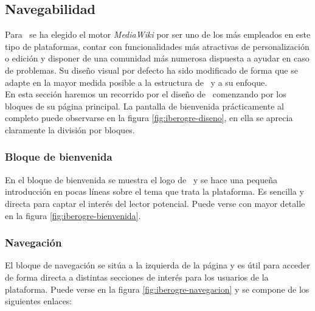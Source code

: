 
\subsection{Navegabilidad}

Para \wiki\ se ha elegido el motor \textit{MediaWiki} \cite{website:wikimedia} por
ser uno de los más empleados en este tipo de plataformas, contar con funcionalidades
más atractivas de personalización o edición y disponer de una comunidad
más numerosa dispuesta a ayudar en caso de problemas. Su diseño visual por
defecto ha sido modificado de forma que se adapte en la mayor medida posible
a la estructura de \wiki\ y a su enfoque.\\

En esta sección haremos un recorrido por el diseño de \wiki\ comenzando
por los bloques de su página principal. La pantalla de bienvenida prácticamente
al completo puede observarse en la figura \ref{fig:iberogre-diseno}, en
ella se aprecia claramente la división por bloques.\\


\subsubsection{Bloque de bienvenida}

En el bloque de bienvenida se muestra el logo de \wiki\ y se hace una pequeña
introducción en pocas líneas sobre el tema que trata la plataforma. Es sencilla
y directa para captar el interés del lector potencial. Puede verse con mayor
detalle en la figura \ref{fig:iberogre-bienvenida}.\\


\subsubsection{Navegación}

El bloque de navegación se sitúa a la izquierda de la página y es útil para
acceder de forma directa a distintas secciones de interés para los usuarios
de la plataforma. Puede verse en la figura \ref{fig:iberogre-navegacion}
y se compone de los siguientes enlaces:

